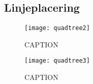 \subsection{Linjeplacering}
\begin{figure}[ht]
	\centering
	\texttt{[image: quadtree2]}
	\captionsetup{width=0.8\textwidth}
	\caption{CAPTION}
	\label{fig:quadtree2}
\end{figure}
\begin{figure}[ht]
	\centering
	\texttt{[image: quadtree3]}
	\captionsetup{width=0.8\textwidth}
	\caption{CAPTION}
	\label{fig:quadtree3}
\end{figure}